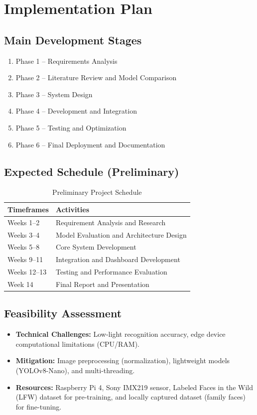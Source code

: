 \documentclass[12pt,a4paper]{article}
\begin{document}
\section{Implementation Plan}
\subsection{Main Development Stages}
\begin{enumerate}
    \item Phase 1 – Requirements Analysis
    \item Phase 2 – Literature Review and Model Comparison
    \item Phase 3 – System Design
    \item Phase 4 – Development and Integration
    \item Phase 5 – Testing and Optimization
    \item Phase 6 – Final Deployment and Documentation
\end{enumerate}

\subsection{Expected Schedule (Preliminary)}
\begin{table}[h]
    \centering
    \caption{Preliminary Project Schedule}
    \begin{tabular}{|l|l|}
        \hline
        \textbf{Timeframes} & \textbf{Activities} \\ \hline
        Weeks 1--2 & Requirement Analysis and Research \\ \hline
        Weeks 3--4 & Model Evaluation and Architecture Design \\ \hline
        Weeks 5--8 & Core System Development \\ \hline
        Weeks 9--11 & Integration and Dashboard Development \\ \hline
        Weeks 12--13 & Testing and Performance Evaluation \\ \hline
        Week 14 & Final Report and Presentation \\ \hline
    \end{tabular}
\end{table}

\subsection{Feasibility Assessment}
\begin{itemize}
    \item \textbf{Technical Challenges:} Low-light recognition accuracy, edge device computational limitations (CPU/RAM).
    \item \textbf{Mitigation:} Image preprocessing (normalization), lightweight models (YOLOv8-Nano), and multi-threading.
    \item \textbf{Resources:} Raspberry Pi 4, Sony IMX219 sensor, Labeled Faces in the Wild (LFW) dataset for pre-training, and locally captured dataset (family faces) for fine-tuning.
\end{itemize}
\end{document}
